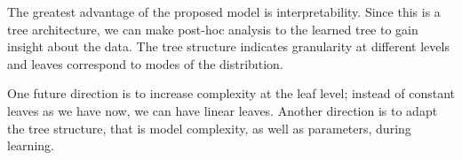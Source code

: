 \documentclass[a4paper,onesided,12pt]{report}
\begin{document}
The greatest advantage of the proposed model is interpretability. Since this is a tree architecture, we can make post-hoc analysis to the learned tree to gain insight about the data. The tree structure indicates granularity at different levels and leaves correspond to modes of the distribıtion.

One future direction is to increase complexity at the leaf level; instead of constant leaves as we have now, we can have linear leaves. Another direction is to adapt the tree structure, that is model complexity, as well as parameters, during learning.



\end{document}
